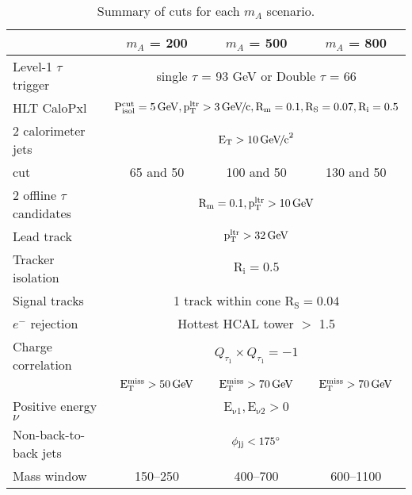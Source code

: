 \begin{table}[tb]
\begin{tabular}{|l|c|c|c|}
\hline
	& $m_{A}$ = 200 \GeVcc & $m_{A}$ = 500 \GeVcc & $m_{A}$ = 800 \GeVcc\\ \hline
	Level-1 $\tau$ trigger & \multicolumn{3}{|c|}{single $\tau$ \ET = 93 GeV or Double $\tau$ \ET = 66 \GeV} \\ \hline
	HLT CaloPxl & \multicolumn{3}{|c|}{$\mathrm{P_{isol}^{cut}} = 5 \,\mathrm{Ge\hspace{-.08em}V}, \mathrm{p_{T}^{ltr}} > 3 {\,\mathrm{Ge}\hspace{-.08em}\mathrm{V}\hspace{-0.16em}/\hspace{-0.08em}\mathrm{c}}, \mathrm{R_{m}} = 0.1, \mathrm{R_{S}} = 0.07, \mathrm{R_{i}}=0.5$} \\ \hline
	2 calorimeter jets &  \multicolumn{3}{|c|}{ $\mathrm{E_{\mathrm{T}}} > 10 {\,\mathrm{Ge\hspace{-.08em}V\hspace{-0.16em}/\hspace{-0.08em}c}^\mathrm{2}}$} \\ \hline
	\ET cut & 65 and 50\GeV & 100 and 50\GeV & 130 and 50\GeV \\ \hline
	2 offline $\tau$ candidates & \multicolumn{3}{|c|}{$\mathrm{R_{m} = 0.1, p_{T}^{ltr} > 10 \,\mathrm{Ge\hspace{-.08em}V}}$} \\ \hline
	Lead track & \multicolumn{3}{|c|}{$\mathrm{p_{T}^{ltr} > 32 \,\mathrm{Ge\hspace{-.08em}V}}$} \\ \hline
	Tracker isolation & \multicolumn{3}{|c|}{$\mathrm{R_{i}}=0.5$} \\ \hline
	Signal tracks & \multicolumn{3}{|c|}{1 track within cone $\mathrm{R_{S}} = 0.04$} \\ \hline
	$e^{-}$ rejection & \multicolumn{3}{|c|}{Hottest HCAL tower $>$ 1.5 \GeV} \\ \hline
	Charge correlation & \multicolumn{3}{|c|}{$Q_{\tau_{1}} \times Q_{\tau_{1}} = -1$} \\ \hline
	\MET & $\mathrm{E_{T}^{miss}} > 50 \,\mathrm{Ge\hspace{-.08em}V}$ & $\mathrm{E_{T}^{miss}} > 70 \,\mathrm{Ge\hspace{-.08em}V}$ & $\mathrm{E_{T}^{miss}} > 70 \,\mathrm{Ge\hspace{-.08em}V}$ \\ \hline
	Positive energy $\nu$ & \multicolumn{3}{|c|}{$\mathrm{E_{\nu 1}, E_{\nu 2} > 0}$} \\ \hline
	Non-back-to-back jets & \multicolumn{3}{|c|}{$\mathrm{\phi_{ j j} < 175^\circ}$} \\ \hline
	Mass window & 150--250 \GeVcc & 400--700 \GeVcc & 600--1100 \GeVcc \\ \hline
\end{tabular}
\caption{Summary of cuts for each $m_{A}$ scenario.\label{table:cuts}}
\end{table}


